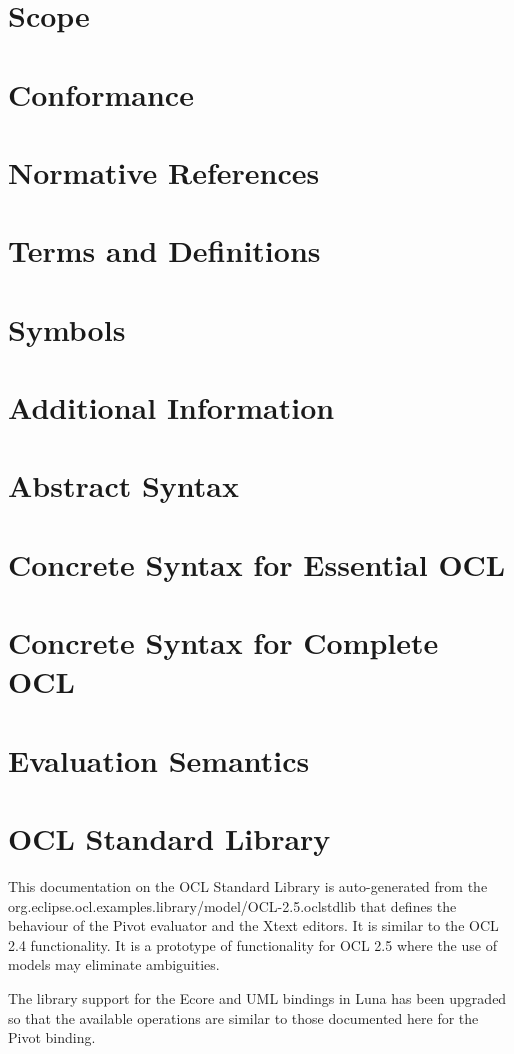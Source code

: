 \documentclass{scrreprt}   %
\begin{document}
\section{Scope}
\section{Conformance}
\section{Normative References}
\section{Terms and Definitions}
\section{Symbols}
\section{Additional Information}

\section{Abstract Syntax}

\section{Concrete Syntax for Essential OCL}


\section{Concrete Syntax for Complete OCL}


\section{Evaluation Semantics}

\section{OCL Standard Library}
This documentation on the OCL Standard Library is auto-generated from the
org.eclipse.ocl.examples.library/model/OCL-2.5.oclstdlib that defines
the behaviour of the Pivot evaluator and the Xtext editors. It is similar to the OCL 2.4 functionality.
It is a prototype of functionality for OCL 2.5 where the use of models may eliminate ambiguities.
		
The library support for the Ecore and UML bindings in Luna has been upgraded so that the available operations
are similar to those documented here for the Pivot binding.

\end{document}
